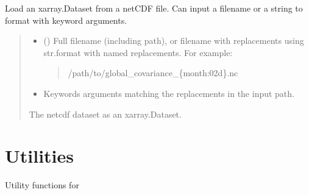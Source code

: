 \documentclass[letterpaper,10pt,english]{sphinxmanual}
\begin{document}

\begin{fulllineitems}
\label{\detokenize{misc:glomar_gridding.io.load_dataset}}
\pysigstartsignatures
\pysiglinewithargsret
{}
{\sphinxparamcomma {}}
{}
\pysigstopsignatures
\sphinxAtStartPar
Load an xarray.Dataset from a netCDF file. Can input a filename or a
string to format with keyword arguments.
\begin{quote}\begin{description}
\begin{itemize}
\item {}
\sphinxAtStartPar
{} () \textendash{}
\sphinxAtStartPar
Full filename (including path), or filename with replacements using
str.format with named replacements. For example:
\begin{quote}

\sphinxAtStartPar
/path/to/global\_covariance\_\{month:02d\}.nc
\end{quote}


\item {}
\sphinxAtStartPar
{} \textendash{} Keywords arguments matching the replacements in the input path.

\end{itemize}

\sphinxAtStartPar
{} \textendash{} The netcdf dataset as an xarray.Dataset.

\sphinxAtStartPar
{}

\end{description}\end{quote}

\end{fulllineitems}



\section{Utilities}
\label{\detokenize{misc:module-glomar_gridding.utils}}\label{\detokenize{misc:utilities}}
\sphinxAtStartPar
Utility functions for 
\end{document}
